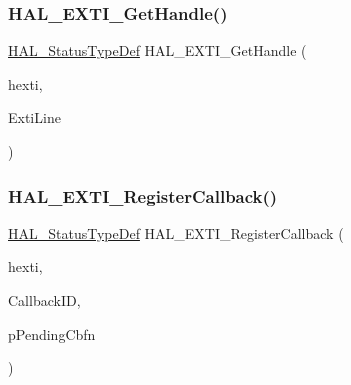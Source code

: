 \mbox{\label{group___e_x_t_i___exported___functions___group1_gaa5856ee92dc1265db144af025673ee46}} 
\subsubsection{\texorpdfstring{H\+A\+L\+\_\+\+E\+X\+T\+I\+\_\+\+Get\+Handle()}{HAL\_EXTI\_GetHandle()}}
{\footnotesize\ttfamily \hyperlink{stm32f4xx__hal__def_8h_a63c0679d1cb8b8c684fbb0632743478f}{H\+A\+L\+\_\+\+Status\+Type\+Def} H\+A\+L\+\_\+\+E\+X\+T\+I\+\_\+\+Get\+Handle (\begin{DoxyParamCaption}\item[{\hyperlink{struct_e_x_t_i___handle_type_def}{E\+X\+T\+I\+\_\+\+Handle\+Type\+Def} $\ast$}]{hexti,  }\item[{uint32\+\_\+t}]{Exti\+Line }\end{DoxyParamCaption})}

\mbox{\label{group___e_x_t_i___exported___functions___group1_gacb6ee7e9f2429c3c3a1c99d4fe2d26d7}} 
\subsubsection{\texorpdfstring{H\+A\+L\+\_\+\+E\+X\+T\+I\+\_\+\+Register\+Callback()}{HAL\_EXTI\_RegisterCallback()}}
{\footnotesize\ttfamily \hyperlink{stm32f4xx__hal__def_8h_a63c0679d1cb8b8c684fbb0632743478f}{H\+A\+L\+\_\+\+Status\+Type\+Def} H\+A\+L\+\_\+\+E\+X\+T\+I\+\_\+\+Register\+Callback (\begin{DoxyParamCaption}\item[{\hyperlink{struct_e_x_t_i___handle_type_def}{E\+X\+T\+I\+\_\+\+Handle\+Type\+Def} $\ast$}]{hexti,  }\item[{\hyperlink{group___e_x_t_i___exported___types_ga0ff36e8796a6ad3f2fc211e534c54c0e}{E\+X\+T\+I\+\_\+\+Callback\+I\+D\+Type\+Def}}]{Callback\+ID,  }\item[{void($\ast$)(void)}]{p\+Pending\+Cbfn }\end{DoxyParamCaption})}

